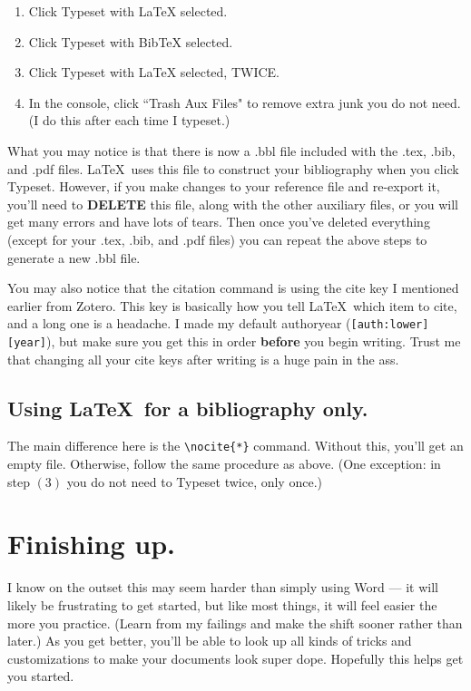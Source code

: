 \documentclass[11pt]{article}
\begin{document}
\begin{enumerate}
\item{Click Typeset with LaTeX selected.}
\item{Click Typeset with BibTeX selected.}
\item{Click Typeset with LaTeX selected, TWICE.}
\item{In the console, click ``Trash Aux Files" to remove extra junk you do not need. (I do this after each time I typeset.)}
\end{enumerate}

What you may notice is that there is now a .bbl file included with the .tex, .bib, and .pdf files. \LaTeX\ uses this file to construct your bibliography when you click Typeset. However, if you make changes to your reference file and re-export it, you'll need to \textbf{DELETE} this file, along with the other auxiliary files, or you will get many errors and have lots of tears. Then once you've deleted everything (except for your .tex, .bib, and .pdf files) you can repeat the above steps to generate a new .bbl file.

You may also notice that the citation command is using the cite key I mentioned earlier from Zotero. This key is basically how you tell \LaTeX\ which item to cite, and a long one is a headache. I made my default authoryear (\verb|[auth:lower][year]|), but make sure you get this in order \textbf{before} you begin writing. Trust me that changing all your cite keys after writing is a huge pain in the ass.

\subsection{Using \LaTeX\ for a bibliography only.}

The main difference here is the \verb|\nocite{*}| command. Without this, you'll get an empty file. Otherwise, follow the same procedure as above. (One exception: in step $(3)$ you do not need to Typeset twice, only once.)

\section{Finishing up.}

I know on the outset this may seem harder than simply using Word --- it will likely be frustrating to get started, but like most things, it will feel easier the more you practice. (Learn from my failings and make the shift sooner rather than later.) As you get better, you'll be able to look up all kinds of tricks and customizations to make your documents look super dope. Hopefully this helps get you started.
\end{document}

